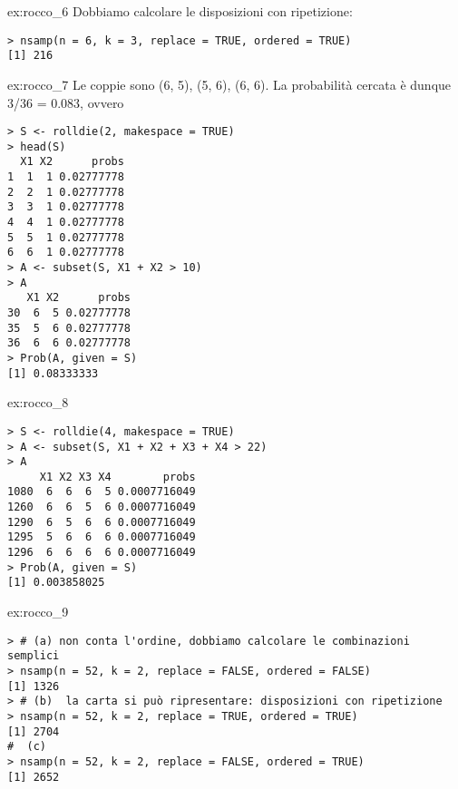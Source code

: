 \begin{sol}{ex:rocco_6}
Dobbiamo calcolare le disposizioni con ripetizione:
\begin{verbatim}
> nsamp(n = 6, k = 3, replace = TRUE, ordered = TRUE)
[1] 216
\end{verbatim}
\end{sol}


\begin{sol}{ex:rocco_7}
Le coppie sono (6, 5), (5, 6), (6, 6). La probabilità cercata è dunque 3/36 = 0.083, ovvero
\begin{verbatim}
> S <- rolldie(2, makespace = TRUE)
> head(S)
  X1 X2      probs
1  1  1 0.02777778
2  2  1 0.02777778
3  3  1 0.02777778
4  4  1 0.02777778
5  5  1 0.02777778
6  6  1 0.02777778
> A <- subset(S, X1 + X2 > 10)
> A
   X1 X2      probs
30  6  5 0.02777778
35  5  6 0.02777778
36  6  6 0.02777778
> Prob(A, given = S)
[1] 0.08333333
\end{verbatim}
\end{sol}


\begin{sol}{ex:rocco_8}
\begin{verbatim}
> S <- rolldie(4, makespace = TRUE)
> A <- subset(S, X1 + X2 + X3 + X4 > 22)
> A
     X1 X2 X3 X4        probs
1080  6  6  6  5 0.0007716049
1260  6  6  5  6 0.0007716049
1290  6  5  6  6 0.0007716049
1295  5  6  6  6 0.0007716049
1296  6  6  6  6 0.0007716049
> Prob(A, given = S)
[1] 0.003858025
\end{verbatim}
\end{sol}


\begin{sol}{ex:rocco_9}
\begin{verbatim}
> # (a) non conta l'ordine, dobbiamo calcolare le combinazioni semplici
> nsamp(n = 52, k = 2, replace = FALSE, ordered = FALSE)
[1] 1326
> # (b)  la carta si può ripresentare: disposizioni con ripetizione
> nsamp(n = 52, k = 2, replace = TRUE, ordered = TRUE)
[1] 2704
#  (c)
> nsamp(n = 52, k = 2, replace = FALSE, ordered = TRUE)
[1] 2652
\end{verbatim}
\end{sol}


